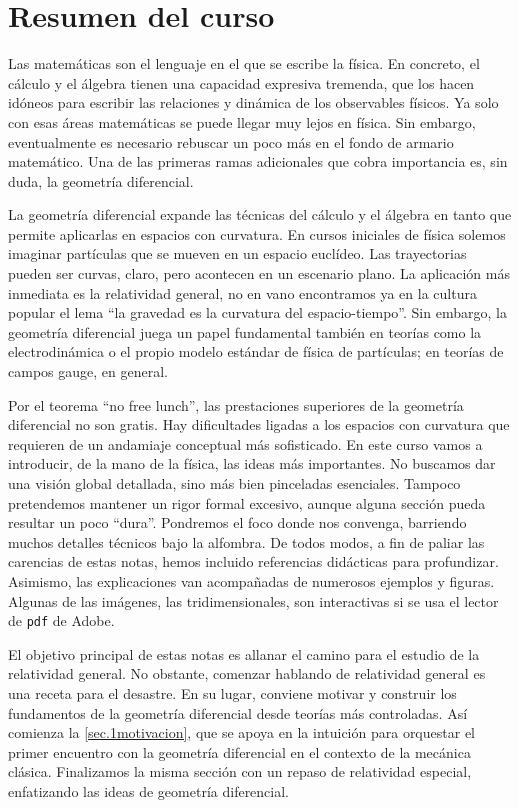 \section*{Resumen del curso}

Las matemáticas son el lenguaje en el que se escribe la física. En concreto, el cálculo y el álgebra tienen una capacidad expresiva tremenda, que los hacen idóneos para escribir las relaciones y dinámica de los observables físicos. Ya solo con esas áreas matemáticas se puede llegar muy lejos en física. Sin embargo, eventualmente es necesario rebuscar un poco más en el fondo de armario matemático. Una de las primeras ramas adicionales que cobra importancia es, sin duda, la geometría diferencial.

La geometría diferencial expande las técnicas del cálculo y el álgebra en tanto que permite aplicarlas en espacios con curvatura. En cursos iniciales de física solemos imaginar partículas que se mueven en un espacio euclídeo. Las trayectorias pueden ser curvas, claro, pero acontecen en un escenario plano. La aplicación más inmediata es la relatividad general, no en vano encontramos ya en la cultura popular el lema ``la gravedad es la curvatura del espacio-tiempo''. Sin embargo, la geometría diferencial juega un papel fundamental también en teorías como la electrodinámica o el propio modelo estándar de física de partículas; en teorías de campos gauge, en general. 

Por el teorema ``no free lunch'', las prestaciones superiores de la geometría diferencial no son gratis. Hay dificultades ligadas a los espacios con curvatura que requieren de un andamiaje conceptual más sofisticado. En este curso vamos a introducir, de la mano de la física, las ideas más importantes. No buscamos dar una visión global detallada, sino más bien pinceladas esenciales. Tampoco pretendemos mantener un rigor formal excesivo, aunque alguna sección pueda resultar un poco ``dura''. Pondremos el foco donde nos convenga, barriendo muchos detalles técnicos bajo la alfombra. De todos modos, a fin de paliar las carencias de estas notas, hemos incluido referencias didácticas para profundizar. Asimismo, las explicaciones van acompañadas de numerosos ejemplos y figuras. Algunas de las imágenes, las tridimensionales, son interactivas si se usa el lector de \texttt{pdf} de Adobe. 

El objetivo principal de estas notas es allanar el camino para el estudio de la relatividad general. No obstante, comenzar hablando de relatividad general es una receta para el desastre. En su lugar, conviene motivar y construir los fundamentos de la geometría diferencial desde teorías más controladas. Así comienza la \cref{sec.1motivacion}, que se apoya en la intuición para orquestar el primer encuentro con la geometría diferencial en el contexto de la mecánica clásica. Finalizamos la misma sección con un repaso de relatividad especial, enfatizando las ideas de geometría diferencial. 

